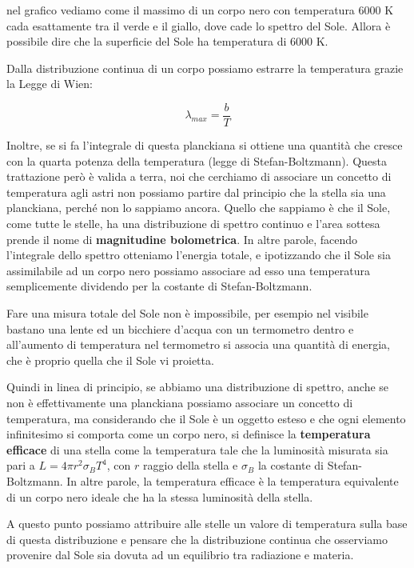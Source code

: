 nel grafico vediamo come il massimo di un corpo nero con temperatura 6000 K cada esattamente tra il verde e il giallo, dove cade lo spettro del Sole. Allora è possibile dire che la superficie del Sole ha temperatura di 6000 K.

Dalla distribuzione continua di un corpo possiamo estrarre la temperatura grazie la Legge di Wien:

$$\lambda_{max}=\frac{b}{T}$$

Inoltre, se si fa l'integrale di questa planckiana si ottiene una quantità che cresce con la quarta potenza della temperatura (legge di Stefan-Boltzmann). Questa trattazione però è valida a terra, noi che cerchiamo di associare un concetto di temperatura agli astri non possiamo partire dal principio che la stella sia una planckiana, perché non lo sappiamo ancora. Quello che sappiamo è che il Sole, come tutte le stelle, ha una distribuzione di spettro continuo e l'area sottesa prende il nome di \textbf{magnitudine bolometrica}. In altre parole, facendo l'integrale dello spettro otteniamo l'energia totale, e ipotizzando che il Sole sia assimilabile ad un corpo nero possiamo associare ad esso una temperatura semplicemente dividendo per la costante di Stefan-Boltzmann.

Fare una misura totale del Sole non è impossibile, per esempio nel visibile bastano una lente ed un bicchiere d'acqua con un termometro dentro e all'aumento di temperatura nel termometro si associa una quantità di energia, che è proprio quella che il Sole vi proietta.

Quindi in linea di principio, se abbiamo una distribuzione di spettro, anche se non è effettivamente una planckiana possiamo associare un concetto di temperatura, ma considerando che il Sole è un oggetto esteso e che ogni elemento infinitesimo si comporta come un corpo nero, si definisce la \textbf{temperatura efficace} di una stella come la temperatura tale che la luminosità misurata sia pari a $L=4\pi r^2 \sigma_B T^4$, con $r$ raggio della stella e $\sigma_B$ la costante di Stefan-Boltzmann. %
In altre parole, la temperatura efficace è la temperatura equivalente di un corpo nero ideale che ha la stessa luminosità della stella.

A questo punto possiamo attribuire alle stelle un valore di temperatura sulla base di questa distribuzione e pensare che la distribuzione continua che osserviamo provenire dal Sole sia dovuta ad un equilibrio tra radiazione e materia.


